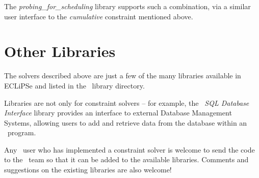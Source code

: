 The {\em probing\_for\_scheduling} library supports such a combination,
via a similar user interface to the {\em cumulative} constraint mentioned
above.


\section{Other Libraries}
The solvers described above are just a few of the many libraries
available in ECLiPSe and listed in the \eclipse\  library directory.

Libraries are not only for constraint solvers -- for example, the
{\em \eclipse\ SQL Database Interface} library provides an interface to
external Database Management Systems, allowing users to add and retrieve data
from the database within an \eclipse\ program.

Any \eclipse\  user who has implemented a constraint solver is welcome to
send the code to the \eclipse\  team so that it can be added to
the available libraries.
Comments and suggestions on the existing libraries are also welcome!

